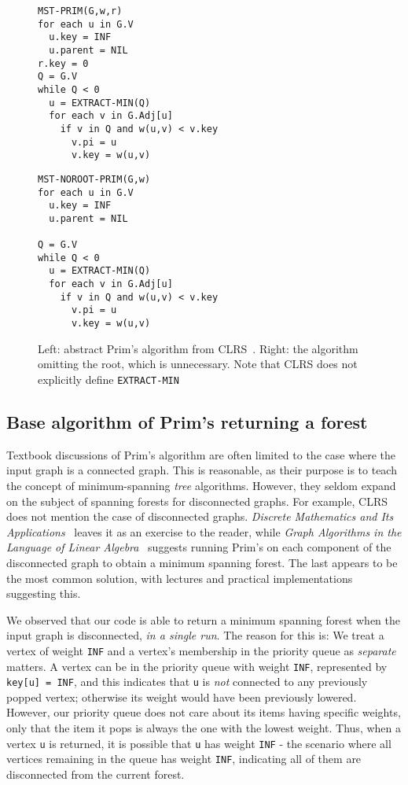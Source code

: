 \begin{figure}
\begin{BVerbatim}[baseline=c]
MST-PRIM(G,w,r)
for each u in G.V
  u.key = INF
  u.parent = NIL
r.key = 0
Q = G.V
while Q < 0
  u = EXTRACT-MIN(Q)
  for each v in G.Adj[u]
    if v in Q and w(u,v) < v.key
      v.pi = u
      v.key = w(u,v)
\end{BVerbatim}
\quad\quad
\begin{BVerbatim}[baseline=c]
MST-NOROOT-PRIM(G,w)
for each u in G.V
  u.key = INF
  u.parent = NIL

Q = G.V
while Q < 0
  u = EXTRACT-MIN(Q)
  for each v in G.Adj[u]
    if v in Q and w(u,v) < v.key
      v.pi = u
      v.key = w(u,v)
\end{BVerbatim}
\caption{Left: abstract Prim's algorithm from CLRS~\cite{clrs}. Right: the algorithm omitting the root, which is unnecessary. Note that CLRS does not explicitly define \texttt{EXTRACT-MIN}}
\end{figure}

\subsection{Base algorithm of Prim's returning a forest}

Textbook discussions of Prim's algorithm are often limited to the case where the input graph is a connected graph. This is reasonable, as their purpose is to teach the concept of minimum-spanning \textit{tree} algorithms. However, they seldom expand on the subject of spanning forests for disconnected graphs. For example, CLRS does not mention the case of disconnected graphs. \textit{Discrete Mathematics and Its Applications}~\cite{rozen} leaves it as an exercise to the reader, while \textit{Graph Algorithms in the Language of Linear Algebra}~\cite{kepnergilbert} suggests running Prim's on each component of the disconnected graph to obtain a minimum spanning forest. The last appears to be the most common solution, with lectures and practical implementations suggesting this.

We observed that our code is able to return a minimum spanning forest when the input graph is disconnected, \textit{in a single run}. The reason for this is: We treat a vertex of weight \texttt{INF} and a vertex's membership in the priority queue as \textit{separate} matters. A vertex can be in the priority queue with weight \texttt{INF}, represented by \texttt{key[u] = INF}, and this indicates that \texttt{u} is \textit{not} connected to any previously popped vertex; otherwise its weight would have been previously lowered. However, our priority queue does not care about its items having specific weights, only that the item it pops is always the one with the lowest weight. Thus, when a vertex \texttt{u} is returned, it is possible that \texttt{u} has weight \texttt{INF} - the scenario where all vertices remaining in the queue has weight \texttt{INF}, indicating all of them are disconnected from the current forest.

